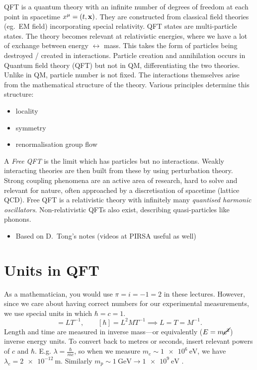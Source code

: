 QFT is a quantum theory with an infinite number of degrees of freedom at each point in spacetime $x^{\mu} = (t, \vb x)$. They are constructed from classical field theories (eg.~EM field) incorporating special relativity.
QFT states are multi-particle states. The theory becomes relevant at relativistic energies, where we have a lot of exchange between energy $\leftrightarrow$ mass. This takes the form of particles being destroyed / created in interactions.
Particle creation and annihilation occurs in Quantum field theory (QFT) but not in QM, differentiating the two theories. Unlike in QM, particle number is not fixed.
The interactions themselves arise from the mathematical structure of the theory. Various principles determine this structure:
\begin{itemize}
  \item locality
  \item symmetry
  \item renormalisation group flow
\end{itemize}

\begin{definition}
A \emph{Free QFT} is the limit which has particles but no interactions. Weakly interacting theories are then built from these by using perturbation theory.
Strong coupling phenomena are an active area of research, hard to solve and relevant for nature, often approached by a discretisation of spacetime (lattice QCD).
Free QFT is a relativistic theory with infinitely many \emph{quantised harmonic oscillators}.
Non-relativistic QFTs also exist, describing quasi-particles like phonons.
\end{definition}

\begin{itemize}
  \item Based on D.~Tong's notes (videos at PIRSA useful as well)
\end{itemize}

\section*{Units in QFT}%
\label{sec:units_in_qft}

As a mathematician, you would use $\pi = i = -1 = 2$ in these lectures. However, since we care about having correct numbers for our experimental measurements, we use special units in which $\hbar = c = 1$.
\begin{equation}
  [c] = L T^{-1}, \qquad [\hbar] = L^2 M T^{-1} \implies L = T = M^{-1}.
\end{equation}
Length and time are measured in inverse mass---or equivalently ($E = m\cancel{c^2}$) inverse energy units.
To convert back to metres or seconds, insert relevant powers of $c$ and $\hbar$.
E.g. $\lambda = \frac{\hbar}{m c}$, so when we measure $m_e \sim \SI{1e6}{\electronvolt}$, we have $\lambda_e = \SI{2e-12}{\meter}$. Similarly $m_p \sim \SI{1}{\giga\electronvolt} \rightarrow \SI{1e9}{\electronvolt}$ .

